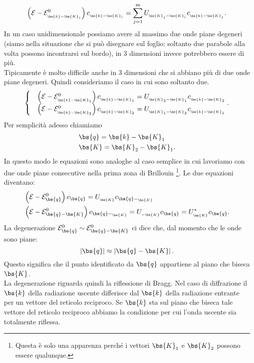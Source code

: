 \[
	\left( \mathcal{E}-\mathcal{E}^0_{_{\bs{k}-\bs{K}_i}} \right) 
	c_{_{\bs{k}-\bs{K}_i}} 
	=
	\sum_{j=1}^{m} U_{_{\bs{K}_j-\bs{K}_i}}c_{_{\bs{k}-\bs{K}_j}}
.\] 
In un caso unidimensionale possiamo avere al massimo due onde piane degeneri (siamo nella situazione che si può disegnare sul foglio: soltanto due parabole alla volta possono incontrarsi sul bordo), in 3 dimensioni invece potrebbero essere di più. \\
Tipicamente  è molto difficile anche in 3 dimensioni che si abbiano più di due onde piane degeneri. Quindi consideriamo il caso in cui sono soltanto due.
\[
	\begin{cases}
		&\left(\mathcal{E}-\mathcal{E}^0_{_{\bs{k}-\bs{K}_1}} \right) 
		c_{_{\bs{k}-\bs{K}_1}} 
		=
		U_{_{\bs{K}_2-\bs{K}_1}}c_{_{\bs{k}-\bs{K}_2}} \\
		&\left(\mathcal{E}-\mathcal{E}^0_{_{\bs{k}-\bs{K}_2}} \right) 
		c_{_{\bs{k}-\bs{K}_2}} 
		=
		U_{_{\bs{K}_1-\bs{K}_2}}c_{_{\bs{k}-\bs{K}_1}} 
	\end{cases}
.\] 
Per semplicità adesso chiamiamo 
\[\begin{aligned}
	&\bs{q} = \bs{k}-\bs{K}_1\\
	&\bs{K} = \bs{K}_2-\bs{K}_1 
.\end{aligned}\]
In questo modo le equazioni sono analoghe al caso semplice in cui lavoriamo con due onde piane consecutive nella prima zona di Brillouin \footnote{Questa è solo una apparenza perché i vettori $\bs{K}_1$ e $\bs{K}_2$ possono essere qualunque.}. Le due equazioni diventano:
\[\begin{aligned}
	&\left( \mathcal{E}-\mathcal{E}^0_{\bs{q}} \right) c_{\bs{q}}
	=
	U_{_{\bs{K}}}c_{\bs{q}-_{\bs{K}}}\\
	&\left( \mathcal{E}-\mathcal{E}^0_{\bs{q}-\bs{K}} \right) c_{\bs{q}-_{\bs{K}}}
	=
	U_{_{-\bs{K}}}c_{\bs{q}} = U^*_{_{\bs{K}}}c_{\bs{q}}
	\label{eq:sistema-equazioni-degenere}
.\end{aligned}\]	
La degenerazione $\mathcal{E}^0_{\bs{q}}\sim \mathcal{E}^0_{\bs{q}-\bs{K}}$ ci dice che, dal momento che le onde sono piane:
\[
	\left| \bs{q} \right| \approx \left| \bs{q}-\bs{K} \right| 
.\] 
Questo significa che il punto identificato da $\bs{q}$ appartiene al piano che biseca $\bs{K}$. \\
La degenerazione riguarda quindi la riflessione di Bragg. Nel caso di diffrazione il $\bs{k}$ della radiazione uscente differisce dal $\bs{k}$ della radiazione entrante per un vettore del reticolo reciproco. Se $\bs{k}$ sta sul piano che biseca tale vettore del reticolo reciproco abbiamo la condizione per cui l'onda uscente sia totalmente riflessa.\\
